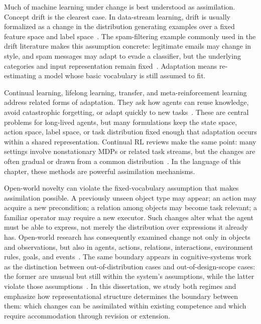Much of machine learning under change is best understood as assimilation.
Concept drift is the clearest case.
In data-stream learning, drift is usually formalized as a change in the distribution generating examples over a fixed feature space and label space~\citep{widmer1996learning,gama2014survey,lu2019concept}.
The spam-filtering example commonly used in the drift literature makes this assumption concrete: legitimate emails may change in style, and spam messages may adapt to evade a classifier, but the underlying categories and input representation remain fixed~\citep{gama2014survey}.
Adaptation means re-estimating a model whose basic vocabulary is still assumed to fit.

Continual learning, lifelong learning, transfer, and meta-reinforcement learning address related forms of adaptation.
They ask how agents can reuse knowledge, avoid catastrophic forgetting, or adapt quickly to new tasks~\citep{ring1994continual,thrun1995lifelong,parisi2019continual,hadsell2020embracing,kirkpatrick2017overcoming,finn2017maml,yu2020metaworld}.
These are central problems for long-lived agents, but many formulations keep the state space, action space, label space, or task distribution fixed enough that adaptation occurs within a shared representation.
Continual RL reviews make the same point: many settings involve nonstationary MDPs or related task streams, but the changes are often gradual or drawn from a common distribution~\citep{khetarpal2022continual}.
In the language of this chapter, these methods are powerful assimilation mechanisms.
\label{sec:drift_vs_novelty}

Open-world novelty can violate the fixed-vocabulary assumption that makes assimilation possible.
A previously unseen object type may appear; an action may acquire a new precondition; a relation among objects may become task relevant; a familiar operator may require a new executor.
Such changes alter what the agent must be able to express, not merely the distribution over expressions it already has.
Open-world research has consequently examined change not only in objects and observations, but also in agents, actions, relations, interactions, environment rules, goals, and events~\citep{senator2019science,holder2025introduction}.
The same boundary appears in cognitive-systems work as the distinction between out-of-distribution cases and out-of-design-scope cases: the former are unusual but still within the system's assumptions, while the latter violate those assumptions~\citep{wray2025requirements}.
In this dissertation, we study both regimes and emphasize how representational structure determines the boundary between them: which changes can be assimilated within existing competence and which require accommodation through revision or extension.

